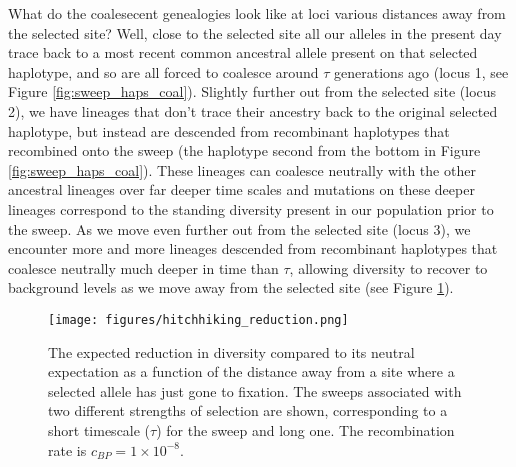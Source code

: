 What do the coalesecent genealogies look like at loci various distances away from the
selected site? Well, close to the selected site all our alleles in the
present day trace back to a most recent common ancestral allele
present on that selected haplotype, and so are all forced to coalesce
around $\tau$ generations ago (locus 1, see Figure \ref{fig:sweep_haps_coal}). Slightly further out from the selected
site (locus 2), we have lineages that don't trace their ancestry back
to the original selected haplotype, but instead are descended from
recombinant haplotypes that recombined onto the sweep (the haplotype second from the
bottom in Figure \ref{fig:sweep_haps_coal}). These lineages can coalesce neutrally with the other ancestral lineages
over far deeper time scales and mutations on these deeper lineages
correspond to the standing diversity present in our population
prior to the sweep. As we move even further out from the selected site
(locus 3), we encounter more and more lineages descended from
recombinant haplotypes that coalesce neutrally much deeper in time than $\tau$, 
allowing diversity to recover to background levels as we move away
from the selected site (see Figure \ref{fig:hitchhiking_reduction}).

\begin{figure}
\begin{center}
\texttt{[image: figures/hitchhiking\_reduction.png]}
\end{center}
\caption{The expected reduction in diversity compared to its neutral expectation as
a function of the distance away from a site where a selected allele
has just gone to fixation. The sweeps associated with two different strengths of selection are shown, corresponding to a short timescale ($\tau$) for the sweep and long one. The recombination rate is $c_{BP}= 1\times
10^{-8}$. } \label{fig:hitchhiking_reduction}
\end{figure}


